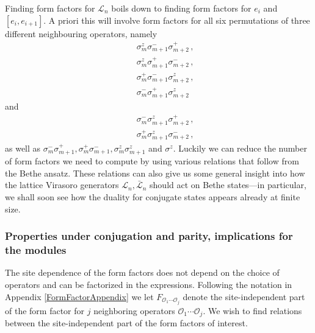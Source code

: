 \documentclass[a4paper,10pt]{article}
\newcommand{\KSgen}{\mathcal{L}}
\begin{document}
Finding form factors for $\KSgen_n$ boils down to finding form factors for $e_i$ and $[e_i,e_{i+1}]$. A priori this will involve form factors for all six permutations of three different neighbouring operators, namely
%
\begin{subequations}
\label{all6-1}
\begin{eqnarray}
& & \sigma_m^{z}\sigma_{m+1}^{-}\sigma_{m+2}^{+} \,, \\
& & \sigma_m^{z}\sigma_{m+1}^{+}\sigma_{m+2}^{-} \,, \\ 
& & \sigma_{m}^{+}\sigma_{m+1}^{-}\sigma_{m+2}^{z} \,, \\
& & \sigma_m^{-}\sigma_{m+1}^{+}\sigma_{m+2}^{z}
\end{eqnarray}
\end{subequations}
%
and
%
\begin{subequations}
\label{all6-2}
\begin{eqnarray}
& & \sigma_m^{-}\sigma_{m+1}^{z}\sigma_{m+2}^{+} \,, \\
& & \sigma_{m}^{+}\sigma_{m+1}^{z}\sigma_{m+2}^{-} \,,
\end{eqnarray}
\end{subequations}
%
as well as  $\sigma_m^{-}\sigma_{m+1}^{+}, \sigma_m^{+}\sigma_{m+1}^{-}, \sigma_m^{z}\sigma_{m+1}^{z}$ and $\sigma^z$. Luckily we can reduce the number of form factors we need to compute by using various relations that follow from the Bethe ansatz. These relations can also give us some general insight into how the lattice Virasoro generators ${\mathcal L}_n, \bar{\mathcal L}_n$ should act on Bethe states---in particular, we shall soon see how the duality for conjugate states appears already at finite size. 




\subsubsection{Properties under conjugation and parity, implications for the modules}\label{conjugate_vs_Bethe}


The site dependence of the form factors does not depend on the choice of operators and can be factorized in the expressions. Following the notation in Appendix \ref{FormFactorAppendix} we let  $F_{\mathcal{O}_1 \cdots \mathcal{O}_j}$ denote the site-independent part of the form factor for $j$ neighboring operators $\mathcal{O}_1 \cdots \mathcal{O}_j$. We wish to find relations between the site-independent part of the form factors of interest.
\end{document}
